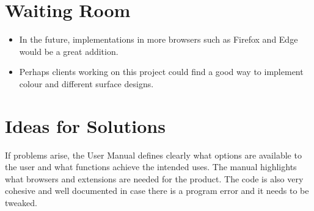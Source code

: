 \documentclass{report}
\begin{document}
\section{Waiting Room}
\begin{itemize}
\item In the future, implementations in more browsers such as Firefox and Edge would be a great addition.  
\item Perhaps clients working on this project could find a good way to implement colour and different surface designs.
\end{itemize}
\section{Ideas for Solutions}
If problems arise, the User Manual defines clearly what options are available to the user and what functions achieve the intended uses.  The manual highlights what browsers and extensions are needed for the product.  The code is also very cohesive and well documented in case there is a program error and it needs to be tweaked.  

 
\end{document}
